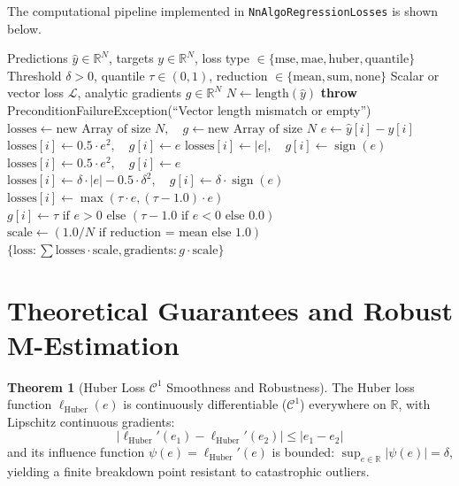 \documentclass[11pt,a4paper]{article}
\theoremstyle{definition}
\newtheorem{theorem}{Theorem}[section]
\begin{document}
The computational pipeline implemented in \texttt{NnAlgoRegressionLosses} is shown below.

\begin{algorithm}[H]
\caption{Continuous Regression Loss Evaluation and Gradient Computation}
\begin{algorithmic}[1]
\Require Predictions $\hat{y} \in \mathbb{R}^N$, targets $y \in \mathbb{R}^N$, loss type $\in \{\text{mse}, \text{mae}, \text{huber}, \text{quantile}\}$
\Require Threshold $\delta > 0$, quantile $\tau \in (0, 1)$, reduction $\in \{\text{mean}, \text{sum}, \text{none}\}$
\Ensure Scalar or vector loss $\mathcal{L}$, analytic gradients $g \in \mathbb{R}^N$
\State $N \gets \text{length}(\hat{y})$
    \State \textbf{throw} PreconditionFailureException(``Vector length mismatch or empty'')
\EndIf
\State $\text{losses} \gets \text{new Array of size } N, \quad g \gets \text{new Array of size } N$
    \State $e \gets \hat{y}[i] - y[i]$
        \State $\text{losses}[i] \gets 0.5 \cdot e^2, \quad g[i] \gets e$
        \State $\text{losses}[i] \gets |e|, \quad g[i] \gets \operatorname{sign}(e)$
            \State $\text{losses}[i] \gets 0.5 \cdot e^2, \quad g[i] \gets e$
        \Else
            \State $\text{losses}[i] \gets \delta \cdot |e| - 0.5 \cdot \delta^2, \quad g[i] \gets \delta \cdot \operatorname{sign}(e)$
        \EndIf
        \State $\text{losses}[i] \gets \max(\tau \cdot e, (\tau - 1.0) \cdot e)$
        \State $g[i] \gets \tau \text{ if } e > 0 \text{ else } (\tau - 1.0 \text{ if } e < 0 \text{ else } 0.0)$
    \EndIf
\EndFor
\State $\text{scale} \gets (1.0 / N \text{ if reduction = mean else } 1.0)$
\State \Return $\{\text{loss}: \sum \text{losses} \cdot \text{scale}, \text{gradients}: g \cdot \text{scale}\}$
\end{algorithmic}
\end{algorithm}

\section{Theoretical Guarantees and Robust M-Estimation}

\begin{theorem}[Huber Loss $\mathcal{C}^1$ Smoothness and Robustness]
The Huber loss function $\ell_{\text{Huber}}(e)$ is continuously differentiable ($\mathcal{C}^1$) everywhere on $\mathbb{R}$, with Lipschitz continuous gradients:
\begin{equation}
|\ell_{\text{Huber}}'(e_1) - \ell_{\text{Huber}}'(e_2)| \le |e_1 - e_2|
\end{equation}
and its influence function $\psi(e) = \ell_{\text{Huber}}'(e)$ is bounded: $\sup_{e \in \mathbb{R}} |\psi(e)| = \delta$, yielding a finite breakdown point resistant to catastrophic outliers.
\end{theorem}
\end{document}
